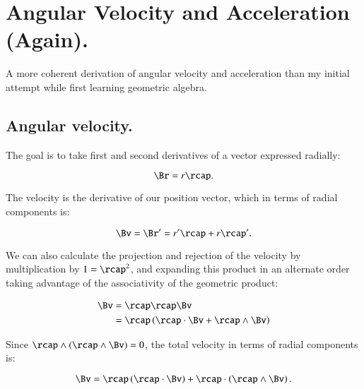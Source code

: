 

\chapter{Angular Velocity and Acceleration (Again).}\label{chap:PJAngAcc}

A more coherent derivation of angular velocity and acceleration than
my initial attempt while first learning geometric algebra.

\section{Angular velocity. }

The goal is to take first and second derivatives of a vector expressed radially:

\begin{equation}
\Br = r \rcap.
\end{equation}

The velocity is the derivative of our position vector, which in terms of radial components is:

\begin{equation}\label{eqn:angular_acc:velocityasrcapprime}
\Bv = \Br' = r' \rcap + r \rcap'.
\end{equation}

We can also calculate the projection and rejection of the velocity by multiplication by $1 = \rcap^2$, and expanding
this product in an alternate order taking advantage of the associativity of the geometric product:

\begin{align*}
\Bv &= \rcap \rcap \Bv \\
    &= \rcap \left ( \rcap \cdot \Bv + \rcap \wedge \Bv \right) \\
\end{align*}

Since $\rcap \wedge (\rcap \wedge \Bv) = 0$, the total velocity in terms of radial components is:

\begin{equation}\label{eqn:angular_acc:velocityprojrej}
\Bv = \rcap \left(\rcap \cdot \Bv\right) + \rcap \cdot \left(\rcap \wedge \Bv\right).
\end{equation}

